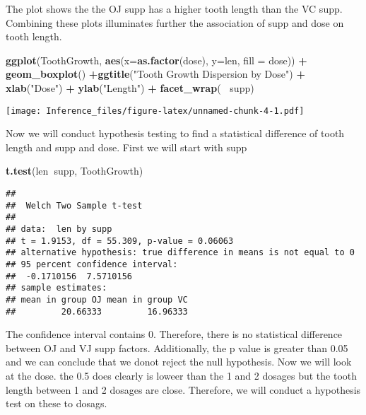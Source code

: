 \documentclass[
]{article}
\newenvironment{Shaded}{\begin{snugshade}}{\end{snugshade}}
\newcommand{\DataTypeTok}[1]{\textcolor[rgb]{0.13,0.29,0.53}{#1}}
\newcommand{\KeywordTok}[1]{\textcolor[rgb]{0.13,0.29,0.53}{\textbf{#1}}}
\newcommand{\NormalTok}[1]{#1}
\newcommand{\OperatorTok}[1]{\textcolor[rgb]{0.81,0.36,0.00}{\textbf{#1}}}
\newcommand{\StringTok}[1]{\textcolor[rgb]{0.31,0.60,0.02}{#1}}
\begin{document}
The plot shows the the OJ supp has a higher tooth length than the VC
supp. Combining these plots illuminates further the association of supp
and dose on tooth length.

\begin{Shaded}
\begin{Highlighting}[]
\KeywordTok{ggplot}\NormalTok{(ToothGrowth, }\KeywordTok{aes}\NormalTok{(}\DataTypeTok{x=}\KeywordTok{as.factor}\NormalTok{(dose), }\DataTypeTok{y=}\NormalTok{len, }\DataTypeTok{fill =}\NormalTok{ dose)) }\OperatorTok{+}\StringTok{ }\KeywordTok{geom_boxplot}\NormalTok{() }\OperatorTok{+}\KeywordTok{ggtitle}\NormalTok{(}\StringTok{"Tooth Growth Dispersion by Dose"}\NormalTok{) }\OperatorTok{+}\StringTok{ }\KeywordTok{xlab}\NormalTok{(}\StringTok{"Dose"}\NormalTok{) }\OperatorTok{+}\StringTok{ }\KeywordTok{ylab}\NormalTok{(}\StringTok{"Length"}\NormalTok{) }\OperatorTok{+}\StringTok{ }\KeywordTok{facet_wrap}\NormalTok{(}\OperatorTok{~}\StringTok{ }\NormalTok{supp)}
\end{Highlighting}
\end{Shaded}

\texttt{[image: Inference\_files/figure-latex/unnamed-chunk-4-1.pdf]}

Now we will conduct hypothesis testing to find a statistical difference
of tooth length and supp and dose. First we will start with supp

\begin{Shaded}
\begin{Highlighting}[]
\KeywordTok{t.test}\NormalTok{(len}\OperatorTok{~}\NormalTok{supp, ToothGrowth)}
\end{Highlighting}
\end{Shaded}

\begin{verbatim}
## 
##  Welch Two Sample t-test
## 
## data:  len by supp
## t = 1.9153, df = 55.309, p-value = 0.06063
## alternative hypothesis: true difference in means is not equal to 0
## 95 percent confidence interval:
##  -0.1710156  7.5710156
## sample estimates:
## mean in group OJ mean in group VC 
##         20.66333         16.96333
\end{verbatim}

The confidence interval contains 0. Therefore, there is no statistical
difference between OJ and VJ supp factors. Additionally, the p value is
greater than 0.05 and we can conclude that we donot reject the null
hypothesis. Now we will look at the dose. the 0.5 does clearly is loweer
than the 1 and 2 dosages but the tooth length between 1 and 2 dosages
are close. Therefore, we will conduct a hypothesis test on these to
dosags.
\end{document}
